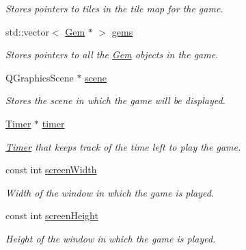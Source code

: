 \begin{DoxyCompactItemize}
\begin{DoxyCompactList}\small\item\em Stores pointers to tiles in the tile map for the game. \end{DoxyCompactList}\item 
\hypertarget{classGameState_a317e70144d6dcb20a63c95e40a7fe8fa}{std\-::vector$<$ \hyperlink{classGem}{Gem} $\ast$ $>$ \hyperlink{classGameState_a317e70144d6dcb20a63c95e40a7fe8fa}{gems}}\label{classGameState_a317e70144d6dcb20a63c95e40a7fe8fa}

\begin{DoxyCompactList}\small\item\em Stores pointers to all the \hyperlink{classGem}{Gem} objects in the game. \end{DoxyCompactList}\item 
\hypertarget{classGameState_a512b05551a91cc55ed51a0cab497c651}{Q\-Graphics\-Scene $\ast$ \hyperlink{classGameState_a512b05551a91cc55ed51a0cab497c651}{scene}}\label{classGameState_a512b05551a91cc55ed51a0cab497c651}

\begin{DoxyCompactList}\small\item\em Stores the scene in which the game will be displayed. \end{DoxyCompactList}\item 
\hypertarget{classGameState_a0e1620fff7c4542aa7363716d3221a92}{\hyperlink{classTimer}{Timer} $\ast$ \hyperlink{classGameState_a0e1620fff7c4542aa7363716d3221a92}{timer}}\label{classGameState_a0e1620fff7c4542aa7363716d3221a92}

\begin{DoxyCompactList}\small\item\em \hyperlink{classTimer}{Timer} that keeps track of the time left to play the game. \end{DoxyCompactList}\item 
\hypertarget{classGameState_a4ff8a3c50df75a74cb2dfcc93c534330}{const int \hyperlink{classGameState_a4ff8a3c50df75a74cb2dfcc93c534330}{screen\-Width}}\label{classGameState_a4ff8a3c50df75a74cb2dfcc93c534330}

\begin{DoxyCompactList}\small\item\em Width of the window in which the game is played. \end{DoxyCompactList}\item 
\hypertarget{classGameState_a8777654820b0bffdee16942ae7935324}{const int \hyperlink{classGameState_a8777654820b0bffdee16942ae7935324}{screen\-Height}}\label{classGameState_a8777654820b0bffdee16942ae7935324}

\begin{DoxyCompactList}\small\item\em Height of the window in which the game is played. \end{DoxyCompactList}\end{DoxyCompactItemize}


